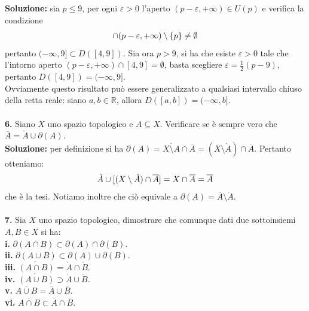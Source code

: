 \documentclass{article}
\begin{document}
\textbf{Soluzione:} sia $p \leq 9$, per ogni $\varepsilon > 0$ l'aperto $(p - \varepsilon, +\infty) \in U(p)$ e verifica la condizione
\begin{gather}
    [4, 9] \cap (p - \varepsilon, +\infty) \setminus \{ p \} \neq \emptyset \notag
\end{gather}
pertanto $(-\infty, 9] \subset D([4, 9])$. Sia ora $p > 9$, si ha che esiste $\varepsilon > 0$ tale che l'intorno aperto $(p - \varepsilon, +\infty) \cap [4, 9] = \emptyset$, basta scegliere $\varepsilon = \frac{1}{2}(p - 9)$, pertanto $D([4, 9]) = (-\infty, 9]$. \\

Ovviamente questo risultato può essere generalizzato a qualsiasi intervallo chiuso della retta reale: siano $a, b \in \mathbb{R}$, allora $D([a, b]) = (-\infty, b]$. \\ \\
\textbf{6.} Siano $X$ uno spazio topologico e $A \subseteq X$. Verificare se è sempre vero che $\overline{A} = \mathring{A} \cup \partial(A)$. \\

\textbf{Soluzione:} per definizione si ha $\partial(A) = \overline{X \setminus A} \cap \overline{A} = (X \setminus \mathring{A}) \cap \overline{A}$. Pertanto otteniamo:
\begin{gather}
    \mathring{A} \cup [(X \setminus \mathring{A}) \cap \overline{A}] = X \cap \overline{A} = \overline{A} \notag
\end{gather}
che è la tesi. Notiamo inoltre che ciò equivale a $\partial(A) = \overline{A} \setminus \mathring{A}$. \\ \\
\textbf{7.} Sia $X$ uno spazio topologico, dimostrare che comunque dati due sottoinsiemi $A, B \in X$ si ha: \\
\textbf{i.} $\partial (A \cap B) \subset \partial (A) \cap \partial (B)$. \\
\textbf{ii.} $\partial (A \cup B) \subset \partial (A) \cup \partial (B)$. \\
\textbf{iii.} $\mathring{(A \cap B)} = \mathring{A} \cap \mathring{B}$. \\
\textbf{iv.} $\mathring{(A \cup B)} \supset \mathring{A} \cup \mathring{B}$. \\
\textbf{v.} $\overline{A \cup B} = \overline{A} \cup \overline{B}$. \\
\textbf{vi.} $\overline{A \cap B} \subset \overline{A} \cap \overline{B}$. \\
\end{document}
